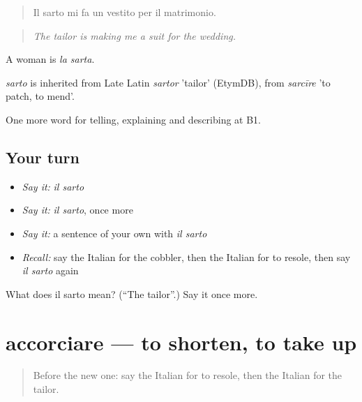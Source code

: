 \begin{quote}
Il sarto mi fa un vestito per il matrimonio.
\end{quote}

\begin{quote}
\emph{The tailor is making me a suit for the wedding.}
\end{quote}

A woman is \emph{la sarta}.

\begin{cousinweb}
\emph{sarto} is inherited from Late Latin \emph{sartor} 'tailor' (EtymDB), from \emph{sarcīre} 'to patch, to mend'.
\end{cousinweb}

\begin{grammarlens}[title={What you've built}]
One more word for telling, explaining and describing at B1.
\end{grammarlens}

\subsection*{Your turn}
\begin{itemize}
\raggedright
  \item \emph{Say it:} \emph{il sarto}
  \item \emph{Say it:} \emph{il sarto}, once more
  \item \emph{Say it:} a sentence of your own with \emph{il sarto}
  \item \emph{Recall:} say the Italian for the cobbler, then the Italian for to resole, then say \emph{il sarto} again
\end{itemize}

\begin{tcolorbox}[breakable,colback=teal!4,colframe=teal!35!black,title={Before you move on}]
What does il sarto mean? (\textquotedblleft{}The tailor\textquotedblright{}.) Say it once more.
\end{tcolorbox}
\section[accorciare]{accorciare — to shorten, to take up}

\label{lesson:IT-C455-accorciare}



\begin{quote}
Before the new one: say the Italian for to resole, then the Italian for the tailor.
\end{quote}

